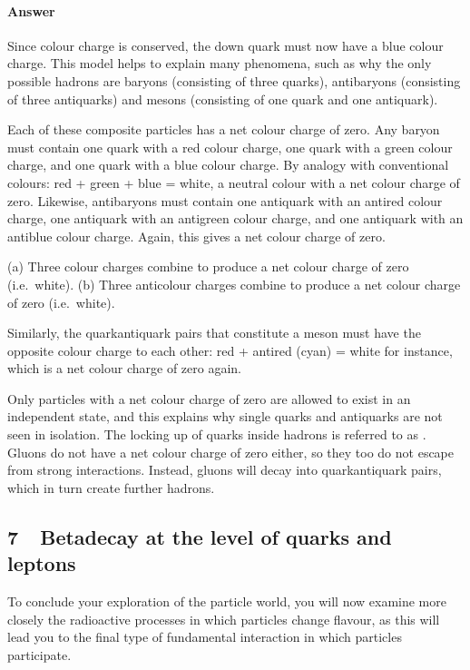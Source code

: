 \documentclass[letterpaper,10pt,english]{sphinxmanual}
\let\sphinxpxdimen\pdfpxdimen\else\newdimen\sphinxpxdimen
\begin{document}
\paragraph{Answer}
\label{\detokenize{content/session_00/Part_00_06:id2}}
Since colour charge is conserved, the down quark must now have a blue colour charge. This model helps to explain many phenomena, such as why the only possible hadrons are baryons (consisting of three quarks), antibaryons (consisting of three antiquarks) and mesons (consisting of one quark and one antiquark).

Each of these composite particles has a net colour charge of zero. Any baryon must contain one quark with a red colour charge, one quark with a green colour charge, and one quark with a blue colour charge. By analogy with conventional colours: red + green + blue = white, a neutral colour with a net colour charge of zero. Likewise, antibaryons must contain one antiquark with an antired colour charge, one antiquark with an antigreen colour charge, and one antiquark with an antiblue colour charge.
Again, this gives a net colour charge of zero.

\sphinxincludegraphics[width=512\sphinxpxdimen,height=231\sphinxpxdimen]{{sm123_t06_p03_f06.tif}.jpg}

 (a) Three colour charges combine to produce a net colour charge of zero (i.e. white). (b) Three anticolour charges combine to produce a net colour charge of zero (i.e. white).

Similarly, the quark\textendash{}antiquark pairs that constitute a meson must have the opposite colour charge to each other: red + antired (cyan) = white for instance, which is a net colour charge of zero again.

Only particles with a net colour charge of zero are allowed to exist in an independent state, and this explains why single quarks and antiquarks are not seen in isolation. The locking up of quarks inside hadrons is referred to as . Gluons do not have a net colour charge of zero either, so they too do not escape from strong interactions. Instead, gluons will decay into quark\textendash{}antiquark pairs, which in turn create further hadrons.


\subsection{7  Beta\sphinxhyphen{}decay at the level of quarks and leptons}
\label{\detokenize{content/session_00/Part_00_07:7_xa0_xa0Beta-decay-at-the-level-of-quarks-and-leptons}}\label{\detokenize{content/session_00/Part_00_07::doc}}
To conclude your exploration of the particle world, you will now examine more closely the radioactive processes in which particles change flavour, as this will lead you to the final type of fundamental interaction in which particles participate.
\end{document}
